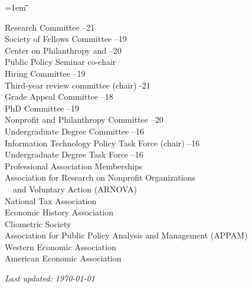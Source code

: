 \documentclass[12pt]{article}
\newlength{\midlength}
\newlength{\firstlength}
\newlength{\listindent}
\newlength{\dategap}
\newlength{\wrapgap}
\newenvironment{datetabbing}{
	\begin{tabbing}
	\parskip=1em
	\hspace*{\listindent}\=\hspace*{\firstlength}\=\hspace*{\midlength}\= \kill
}{
	\end{tabbing}
}
\begin{document}
\begin{datetabbing}
\>	\>	Research Committee									--21	\'	\\[\wrapgap]
\>	\>	Society of Fellows Committee							--19	\'	\\[\wrapgap]
\>	\>	Center on Philanthropy and							--20	\'	\\[\wrapgap]
\>	\>  \hspace{1em}Public Policy Seminar co-chair			\>					\'	\\[\wrapgap]
\>	\>	Hiring Committee										--19	\'	\\[\wrapgap]
\>	\>	Third-year review committee (chair)					-21		\'	\\[\wrapgap]
\>	\>	Grade Appeal Committee								--18	\'	\\[\wrapgap]
\>	\>	PhD Committee										--19	\'	\\[\wrapgap]
\>	\>	Nonprofit and Philanthropy Committee					--20	\'	\\[\wrapgap]
\>	\>	Undergraduate Degree Committee						--16	\'	\\[\wrapgap]
\>	\>	Information Technology Policy Task Force (chair)		--16	\'	\\[\wrapgap]
\>	\>	Undergraduate Degree Task Force						--16	\'	\\[\dategap]
\>	Professional Association Memberships												\\[\wrapgap]
\>	\>	Association for Research on Nonprofit Organizations						\>	\\[\wrapgap]
\>	\>	~~and Voluntary Action (ARNOVA)											\>	\\[\wrapgap]
\>	\>	National Tax Association													\>	\\[\wrapgap]
\>	\>	Economic History Association												\>	\\[\wrapgap]
\>	\>	Cliometric Society														\>	\\[\wrapgap]
\>	\>	Association for Public Policy Analysis and Management (APPAM)			\>	\\[\wrapgap]
\>	\>	Western Economic Association												\>	\\[\wrapgap]
\>	\>	American Economic Association											%
\end{datetabbing}

	
\vfill{}
\begin{scriptsize}
\textit{Last updated: \today{} }
\end{scriptsize}
\end{document}
